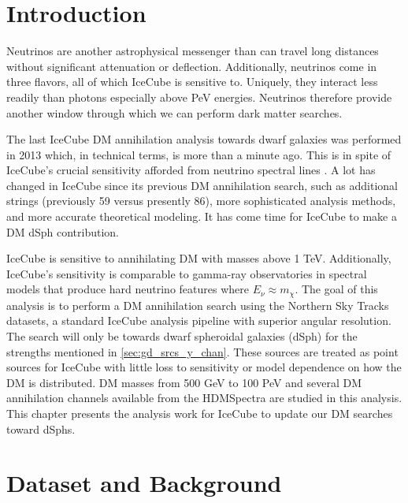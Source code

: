 \section{Introduction} \label{sec:icDM_intro}

Neutrinos are another astrophysical messenger than can travel long distances without significant attenuation or deflection.
Additionally, neutrinos come in three flavors, all of which IceCube is sensitive to.
Uniquely, they interact less readily than photons especially above PeV energies.
Neutrinos therefore provide another window through which we can perform dark matter searches.

The last IceCube DM annihilation analysis towards dwarf galaxies was performed in 2013 \cite{IC3_DM2013} which, in technical terms, is more than a minute ago.
This is in spite of IceCube's crucial sensitivity afforded from neutrino spectral lines \cite{IC3_DM_DanHooper}.
A lot has changed in IceCube since its previous DM annihilation search, such as additional strings (previously 59 versus presently 86), more sophisticated analysis methods, and more accurate theoretical modeling.
It has come time for IceCube to make a DM dSph contribution.

IceCube is sensitive to annihilating DM with masses above 1 TeV.
Additionally, IceCube's sensitivity is comparable to gamma-ray observatories in spectral models that produce hard neutrino features where $E_\nu \approx m_\chi$.
The goal of this analysis is to perform a DM annihilation search using the Northern Sky Tracks datasets, a standard IceCube analysis pipeline with superior angular resolution.
The search will only be towards dwarf spheroidal galaxies (dSph) for the strengths mentioned in \cref{sec:gd_srcs_y_chan}.
These sources are treated as point sources for IceCube with little loss to sensitivity or model dependence on how the DM is distributed.
DM masses from 500 GeV to 100 PeV and several DM annihilation channels available from the HDMSpectra \cite{Rodd:HDM_spec} are studied in this analysis.
This chapter presents the analysis work for IceCube to update our DM searches toward dSphs.

\section{Dataset and Background}\label{sec:icDM_databgd}

